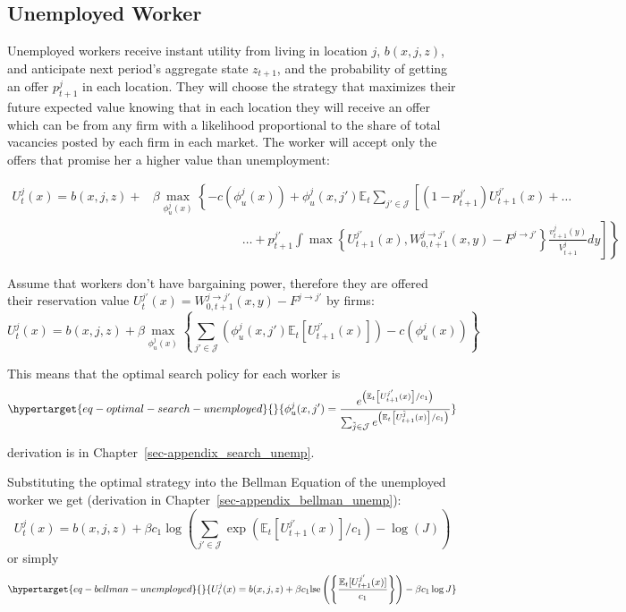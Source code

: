\documentclass[
  letterpaper,
  DIV=11,
  numbers=noendperiod]{scrreprt}
\begin{document}
\hypertarget{unemployed-worker}{%
\subsection{Unemployed Worker}\label{unemployed-worker}}

Unemployed workers receive instant utility from living in location
\(j\), \(b(x,j, z)\), and anticipate next period's aggregate state
\(z_{t+1}\), and the probability of getting an offer \(p^j_{t+1}\) in
each location. They will choose the strategy that maximizes their future
expected value knowing that in each location they will receive an offer
which can be from any firm with a likelihood proportional to the share
of total vacancies posted by each firm in each market. The worker will
accept only the offers that promise her a higher value than
unemployment:

\begin{align*}
U^{j}_{t}(x) = b(x,j, z) + &\beta\max_{\phi^j_u(x)}\left\{ -c(\phi^j_u(x)) + \phi^j_u(x, j')\mathbb{E}_{t}
      \sum_{j'\in \mathcal{J}} \left[ 
      (1-p^{j'}_{t+1})U^{j'}_{t+1}(x) +\ldots\right. \right. \\
& \left. \left. \hspace{3cm} \ldots + p^{j'}_{t+1} \int \max\left\{U^{j'}_{t+1}(x),W^{j\to j'}_{0, t+1}(x,y)- F^{j \to 
j'}\right\}\frac{v^{j}_{t+1}(y)}{V^{j}_{t+1}}dy \right] \right\} 
\end{align*}

Assume that workers don't have bargaining power, therefore they are
offered their reservation value
\(U^{j'}_t(x)=W^{j\to j'}_{0, t+1}(x,y)- F^{j \to j'}\) by firms:
\[U^{j}_{t}(x) = b(x, j, z) + \beta \max_{\phi^j_u(x)} \left\{\sum_{j'\in \mathcal{J}} \left(\phi^j_u(x, j')\mathbb{E}_t\left[U^{j'}_{t+1}(x)  \right]\right) -c(\phi^j_u(x)) \right\} \]

This means that the optimal search policy for each worker is
\begin{equation}\protect\hypertarget{eq-optimal-search-unemployed}{}{ \phi^j_u(x,j') = \frac{e^{\left(\mathbb{E}_t\left[U^{j'}_{t+1}(x)\right] /c_1\right)}}{\sum_{\tilde{j}\in \mathcal{J}}e^{\left(\mathbb{E}_t\left[U^{\tilde{j}}_{t+1}(x)\right] /c_1\right)}}}\label{eq-optimal-search-unemployed}\end{equation}

derivation is in Chapter~\ref{sec-appendix_search_unemp}.

Substituting the optimal strategy into the Bellman Equation of the
unemployed worker we get (derivation in
Chapter~\ref{sec-appendix_bellman_unemp}):
\[U^{j}_{t}(x) = b(x, j, z) + \beta c_1 \log{\left( \sum_{j' \in \mathcal{J}}\exp{\left(\mathbb{E}_t[U_{t+1}^{j'}(x)]/c_1\right)}-\log{(J)}\right)}\]
or simply
\begin{equation}\protect\hypertarget{eq-bellman-unemployed}{}{U^{j}_{t}(x)=b(x,j,z)+\beta c_{1}\text{lse}\left(\left\{\frac{\mathbb{E}_{t}[U^{j'}_{t+1}(x)]}{c_{1}}\right\}\right) - \beta c_{1}\log{J}}\label{eq-bellman-unemployed}\end{equation}
\end{document}
